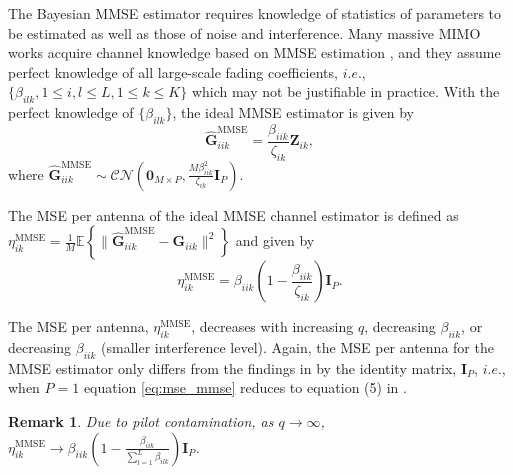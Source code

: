 \documentclass[journal,12pt,onecolumn]{IEEEtran}
\newtheorem{remark}{Remark}
\begin{document}
The Bayesian MMSE estimator requires knowledge of statistics of parameters to be estimated as well as those of noise and interference. Many massive MIMO works acquire channel knowledge based on MMSE estimation \cite{marzetta:pilotContamination, Marzetta:finitedimensionalchannels}, and they assume perfect knowledge of all large-scale fading coefficients, $i.e.$, $\{\beta_{ilk}, 1 \leq i, l \leq L, 1 \leq k \leq K\}$ which may not be justifiable in practice. With the perfect knowledge of $\{\beta_{ilk}\}$, the ideal MMSE estimator is given by \cite{kay:estimationbook}
\begin{equation}\label{eq:mmse}
\hat{\textbf{G}}_{iik}^{\text{MMSE}} = \frac{\beta_{iik}}{\zeta_{ik}}\textbf{Z}_{ik},
\end{equation}
where $\hat{\textbf{G}}_{iik}^{\text{MMSE}} \sim \mathcal{CN}(\textbf{0}_{M \times P},\frac{M \beta_{iik}^{2}}{\zeta_{ik}}\textbf{I}_{P})$.

The MSE per antenna of the ideal MMSE channel estimator is defined as $\eta_{ik}^{\text{MMSE}} = \frac{1}{M} \mathbb{E} \left\lbrace \lVert  \hat{\textbf{G}}_{iik}^{\text{MMSE}} - \textbf{G}_{iik} \rVert^{2} \right\rbrace$ and given by \cite{kay:estimationbook}
\begin{equation}\label{eq:mse_mmse}
\eta_{ik}^{\text{MMSE}} = \beta_{iik}\left( 1 - \frac{\beta_{iik}}{\zeta_{ik}} \right) \textbf{I}_{P}.
\end{equation}

The MSE per antenna, $\eta_{ik}^{\text{MMSE}}$, decreases with increasing $q$, decreasing $\beta_{iik}$, or decreasing $\beta_{iik}$ (smaller interference level). Again, the MSE per antenna for the MMSE estimator only differs from the findings in \cite{Amin:channelEstPilotCont} by the identity matrix, $ \textbf{I}_{P}$, $i.e.$, when $P = 1$ equation \eqref{eq:mse_mmse} reduces to equation (5) in \cite{Amin:channelEstPilotCont}.

\begin{remark} Due to pilot contamination, as $q \to\infty$, $\eta_{ik}^{\text{MMSE}} \to \beta_{iik} \left( 1 - \frac{\beta_{iik}}{\sum_{l=1}^{L}{\beta_{ilk}}} \right) \textbf{I}_{P}$. \end{remark}
\end{document}
